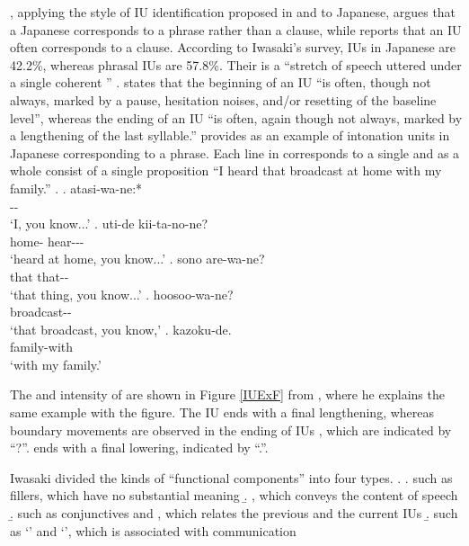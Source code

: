 ,
applying the style of IU identification proposed in  and   to Japanese,
argues that a Japanese  corresponds to a phrase rather than a clause,
while  reports that an  IU often corresponds to a clause.
According to Iwasaki's survey,
 IUs in Japanese are 42.2\%,
whereas phrasal IUs are 57.8\%.
Their  is a ``stretch of speech uttered under a single coherent '' \cite[17]{duboisetal92}.
 states that
the beginning of an IU ``is often, though not always, marked by a pause, hesitation noises, and/or resetting of the baseline  level'',
whereas the ending of an IU ``is often, again though not always, marked by a lengthening of the last syllable.''
 provides \Next as an example of intonation units in Japanese corresponding to a phrase.
Each line in \Next corresponds to a single 
and \Next[a-e] as a whole consist of a single proposition
``I heard that broadcast at home with my family.''
%
\ex.
 \ag. atasi-wa-ne:* \\
      -- \\
      `I, you know...'
 \bg. uti-de kii-ta-no-ne? \\
      home- hear--- \\
      `heard at home, you know...'
 \bg. sono are-wa-ne? \\
      that that-- \\
      `that thing, you know...'
 \bg. hoosoo-wa-ne? \\
      broadcast-- \\
      `that broadcast, you know,'
 \bg. kazoku-de. \\
      family-with \\
      `with my family.'
 \hfill{\cite[40]{iwasaki93}}

The  and intensity of \Next are shown in Figure \ref{IUExF} from
,
where he explains the same example with the figure.
The IU \Next[a] ends with a final  lengthening,
whereas boundary  movements are observed in the ending of IUs \Next[b-d],
which are indicated by ``?''.
\Next[e] ends with a final lowering, indicated by ``.''.

Iwasaki divided the kinds of ``functional components'' into four types.
%
\ex.
 \a.  such as fillers, which have no substantial meaning
 \b. , which conveys the content of speech
 \b.  such as conjunctives and , which relates the previous and the current IUs
 \b.  such as  `' and  `', which is associated with communication

